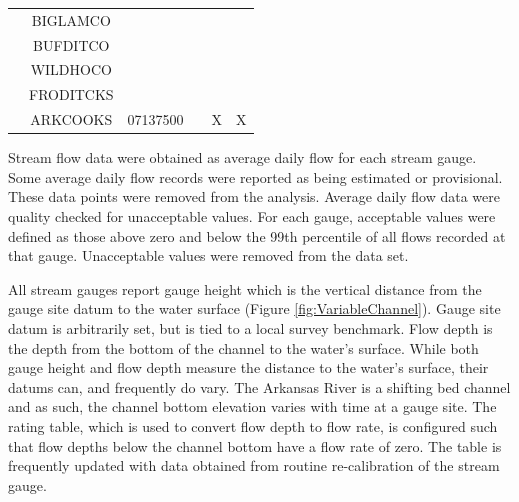 \begin{table}[htbp]
\begin{tabular}{cccccc}
  	                      & BIGLAMCO  &                         &           &             &  \\
  	                      & BUFDITCO  &                         &           &             &  \\
  	                      & WILDHOCO  &                         &           &             &  \\
  	                      & FRODITCKS &                         &           &             &  \\
  	                      & ARKCOOKS  &        07137500         &           &      X      &  X  \\ \bottomrule
  \end{tabular}
\end{table}

Stream flow data were obtained as average daily flow for each stream gauge. Some average daily flow records were reported as being estimated or provisional.  These data points were removed from the analysis.  Average daily flow data were quality checked for unacceptable values.  For each gauge, acceptable values were defined as those above zero and below the 99th percentile of all flows recorded at that gauge.  Unacceptable values were removed from the data set.

All stream gauges report gauge height which is the vertical distance from the gauge site datum to the water surface (Figure \ref{fig:VariableChannel}).  Gauge site datum is arbitrarily set, but is tied to a local survey benchmark.  Flow depth is the depth from the bottom of the channel to the water's surface.  While both gauge height and flow depth measure the distance to the water's surface, their datums can, and frequently do vary.  The Arkansas River is a shifting bed channel and as such, the channel bottom elevation varies with time at a gauge site.  The rating table, which is used to convert flow depth to flow rate, is configured such that flow depths below the channel bottom have a flow rate of zero.  The table is frequently updated with data obtained from routine re-calibration of the stream gauge.

